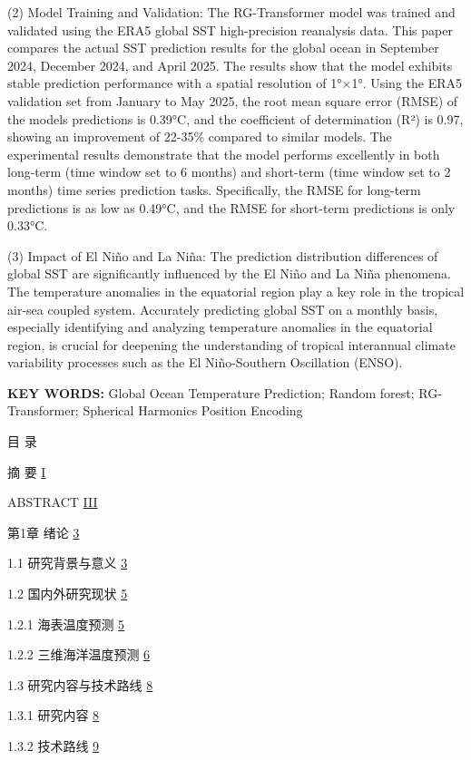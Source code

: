 \documentclass[
  12pt,
]{article}
\begin{document}
(2) Model Training and Validation: The RG-Transformer model was trained
and validated using the ERA5 global SST high-precision reanalysis data.
This paper compares the actual SST prediction results for the global
ocean in September 2024, December 2024, and April 2025. The results show
that the model exhibits stable prediction performance with a spatial
resolution of 1°×1°. Using the ERA5 validation set from January to May
2025, the root mean square error (RMSE) of the model\textquotesingle s
predictions is 0.39°C, and the coefficient of determination (R²) is
0.97, showing an improvement of 22-35\% compared to similar models. The
experimental results demonstrate that the model performs excellently in
both long-term (time window set to 6 months) and short-term (time window
set to 2 months) time series prediction tasks. Specifically, the RMSE
for long-term predictions is as low as 0.49°C, and the RMSE for
short-term predictions is only 0.33°C.

(3) Impact of El Niño and La Niña: The prediction distribution
differences of global SST are significantly influenced by the El Niño
and La Niña phenomena. The temperature anomalies in the equatorial
region play a key role in the tropical air-sea coupled system.
Accurately predicting global SST on a monthly basis, especially
identifying and analyzing temperature anomalies in the equatorial
region, is crucial for deepening the understanding of tropical
interannual climate variability processes such as the El Niño-Southern
Oscillation (ENSO).

\textbf{KEY WORDS:} Global Ocean Temperature Prediction; Random forest;
RG-Transformer; Spherical Harmonics Position
Encoding\textbf{\hfill\break
}

目 录

摘 要 \hyperref[ux6458-ux8981]{I}

ABSTRACT \hyperref[abstract]{III}

第1章 绪论 \hyperref[_Toc1619232084]{3}

1.1 研究背景与意义 \hyperref[_Toc1520861004]{3}

1.2 国内外研究现状 \hyperref[_Toc1760527634]{5}

1.2.1 海表温度预测 \hyperref[_Toc1158256272]{5}

1.2.2 三维海洋温度预测 \hyperref[_Toc2021387096]{6}

1.3 研究内容与技术路线 \hyperref[_Toc261626932]{8}

1.3.1 研究内容 \hyperref[_Toc1264820715]{8}

1.3.2 技术路线 \hyperref[_Toc2048618999]{9}
\end{document}
